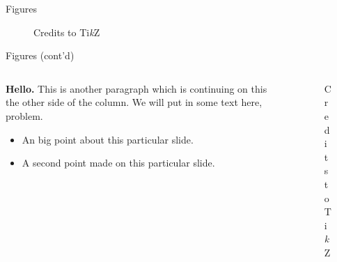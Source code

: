 \documentclass[compress, aspectratio=169]{beamer}
\begin{document}
\begin{frame}{Figures}
  \begin{figure}
    \centering
    \caption{Credits to Ti\textit{k}Z}
  \end{figure}
\end{frame}

\begin{frame}{Figures (cont'd)}
  \begin{columns}[c, onlytextwidth]
  \begin{column}{.5\textwidth}
      \textbf{Hello.} This is another paragraph which is continuing on
      this the other side of the column. We will put in some text 
      here, problem.

      \begin{itemize}
          \item An big point about this particular slide.
          \item A second point made on this particular slide.
      \end{itemize}
  \end{column}%
  \begin{column}{.45\textwidth}
      \begin{figure}
        \centering
        \caption{Credits to Ti\textit{k}Z}
      \end{figure}
  \end{column}
  \end{columns}
\end{frame}
\end{document}
